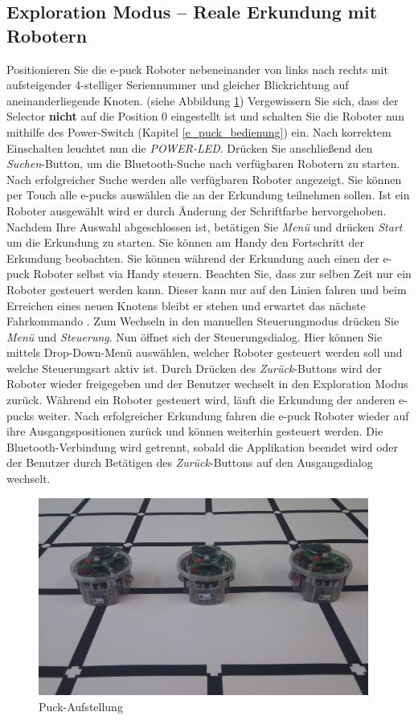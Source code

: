 \documentclass[10pt,a4paper]{article}
\begin{document}
	\subsection{Exploration Modus -- Reale Erkundung mit Robotern}
	\label{subsec:reale_erkundung}
		Positionieren Sie die e-puck Roboter nebeneinander von links nach rechts mit aufsteigender 4-stelliger Seriennummer und gleicher Blickrichtung auf 
		aneinanderliegende Knoten. 
		(siehe Abbildung \ref{puck_aufstellung})
		Vergewissern Sie sich, dass der Selector \textbf{nicht} auf die Position 0	eingestellt ist und schalten Sie die Roboter nun mithilfe des Power-Switch (Kapitel 
		\ref{e_puck_bedienung}) ein. Nach korrektem Einschalten leuchtet nun die 
		\textit{POWER-LED}. Dr\"ucken Sie anschlie\ss end den \textit{Suchen}-Button, um die Bluetooth-Suche nach verf\"ugbaren Robotern zu starten. Nach 								erfolgreicher	Suche werden alle verf\"ugbaren Roboter angezeigt. Sie k\"onnen per Touch alle e-pucks ausw\"ahlen die an der Erkundung teilnehmen sollen. Ist 					ein Roboter ausgew\"ahlt wird er durch \"Anderung der Schriftfarbe hervorgehoben. Nachdem Ihre Auswahl abgeschlossen ist, bet\"atigen Sie \textit{Men\"u} 					und dr\"ucken  \textit{Start} um die Erkundung zu starten. Sie k\"onnen am Handy den Fortschritt der Erkundung beobachten. Sie k\"onnen w\"ahrend der
		Erkundung auch einen der e-puck Roboter selbst via Handy steuern. Beachten Sie, dass zur selben Zeit nur ein Roboter gesteuert werden kann. Dieser kann nur
		auf den  Linien fahren und beim Erreichen eines neuen Knotens bleibt er stehen und erwartet das n\"achste Fahrkommando . Zum Wechseln in den manuellen 
		Steuerungmodus dr\"ucken Sie \textit{Men\"u} und \textit{Steuerung}. Nun \"offnet sich der Steuerungsdialog. Hier k\"onnen Sie mittels Drop-Down-Men\"u 
		ausw\"ahlen, welcher Roboter gesteuert werden soll und welche Steuerungsart aktiv ist. Durch Dr\"ucken des \textit{Zur\"uck}-Buttons wird der Roboter wieder
		freigegeben und der Benutzer wechselt in den Exploration Modus zur\"uck. W\"ahrend ein Roboter gesteuert wird, l\"auft die Erkundung der anderen e-pucks
		weiter. Nach erfolgreicher Erkundung fahren die e-puck Roboter wieder auf ihre Ausgangspositionen zur\"uck und k\"onnen weiterhin gesteuert werden. Die
		Bluetooth-Verbindung wird getrennt, sobald die Applikation beendet wird oder der Benutzer durch Bet\"atigen des \textit{Zur\"uck}-Buttons auf den 
		Ausgangsdialog wechselt. \\
		\begin{figure}[htbp]
			\includegraphics[height=6.5cm]{images/puckaufstellung} 
			\caption{Puck-Aufstellung}
			\label{puck_aufstellung}
		\end{figure}
\end{document}
